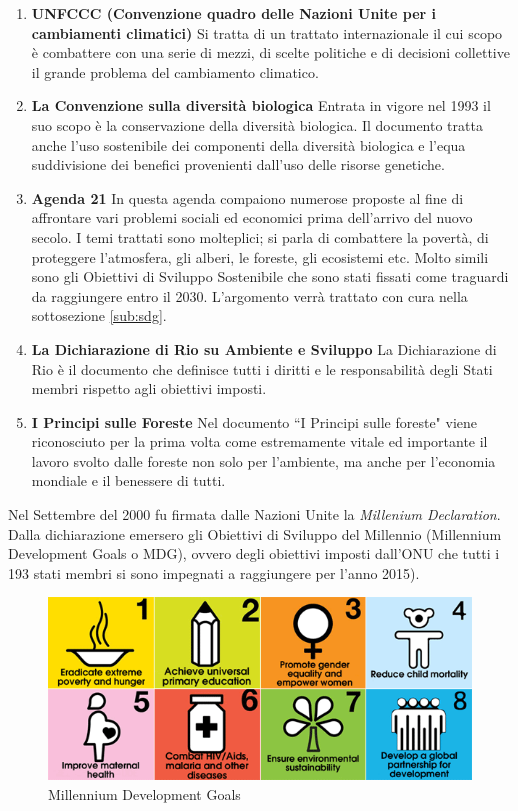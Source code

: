 \begin{enumerate}
    \item \textbf{UNFCCC (Convenzione quadro delle Nazioni Unite per i cambiamenti climatici)}\newline
Si tratta di un trattato internazionale il cui scopo è combattere con una serie di mezzi, di scelte politiche e di decisioni collettive il grande problema del cambiamento climatico.
    \item \textbf{La Convenzione sulla diversità biologica}\newline
    Entrata in vigore nel 1993 il suo scopo è la conservazione della diversità biologica.\newline
    Il documento tratta anche l'uso sostenibile dei componenti della diversità biologica e l'equa suddivisione dei benefici provenienti dall'uso delle risorse genetiche.
    \item \textbf{Agenda 21}\newline
    In questa agenda compaiono numerose proposte al fine di affrontare vari problemi sociali ed economici prima dell'arrivo del nuovo secolo. I temi trattati sono molteplici; si parla di combattere la povertà, di proteggere l'atmosfera, gli alberi, le foreste, gli ecosistemi etc.\newline 
    Molto simili sono gli Obiettivi di Sviluppo Sostenibile che sono stati fissati come traguardi da raggiungere entro il 2030. L'argomento verrà trattato con cura nella sottosezione \ref{sub:sdg}.
    \item \textbf{La Dichiarazione di Rio su Ambiente e Sviluppo}\newline
    La Dichiarazione di Rio è il documento che definisce tutti i diritti e le responsabilità degli Stati membri rispetto agli obiettivi imposti.
    \item \textbf{I Principi sulle Foreste}\newline
    Nel documento ``I Principi sulle foreste" viene riconosciuto per la prima volta come estremamente vitale ed importante il lavoro svolto dalle foreste non solo per l'ambiente, ma anche per l'economia mondiale e il benessere di tutti. 
\end{enumerate}
\noindent Nel Settembre del 2000 fu firmata dalle Nazioni Unite la \textit{Millenium Declaration}. Dalla dichiarazione emersero gli Obiettivi di Sviluppo del Millennio (Millennium Development Goals o MDG), ovvero degli obiettivi imposti dall'ONU che tutti i 193 stati membri si sono impegnati a raggiungere per l'anno 2015).
\begin{figure}[H]
    \centering
  \includegraphics[width=\linewidth]{img/mdgs.png}
  \caption{Millennium Development Goals \cite{mdgImg}}
\end{figure}
